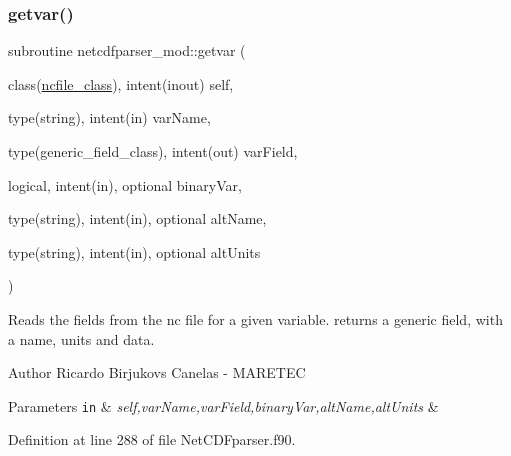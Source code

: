 \subsubsection{\texorpdfstring{getvar()}{getvar()}}
{\footnotesize\ttfamily subroutine netcdfparser\+\_\+mod\+::getvar (\begin{DoxyParamCaption}\item[{class(\mbox{\hyperlink{structnetcdfparser__mod_1_1ncfile__class}{ncfile\+\_\+class}}), intent(inout)}]{self,  }\item[{type(string), intent(in)}]{var\+Name,  }\item[{type(generic\+\_\+field\+\_\+class), intent(out)}]{var\+Field,  }\item[{logical, intent(in), optional}]{binary\+Var,  }\item[{type(string), intent(in), optional}]{alt\+Name,  }\item[{type(string), intent(in), optional}]{alt\+Units }\end{DoxyParamCaption})\hspace{0.3cm}{\ttfamily [private]}}



Reads the fields from the nc file for a given variable. returns a generic field, with a name, units and data. 

\begin{DoxyAuthor}{Author}
Ricardo Birjukovs Canelas -\/ M\+A\+R\+E\+T\+EC 
\end{DoxyAuthor}

\begin{DoxyParams}[1]{Parameters}
\mbox{\tt in}  & {\em self,var\+Name,var\+Field,binary\+Var,alt\+Name,alt\+Units} & \\
\hline
\end{DoxyParams}


Definition at line 288 of file Net\+C\+D\+Fparser.\+f90.


